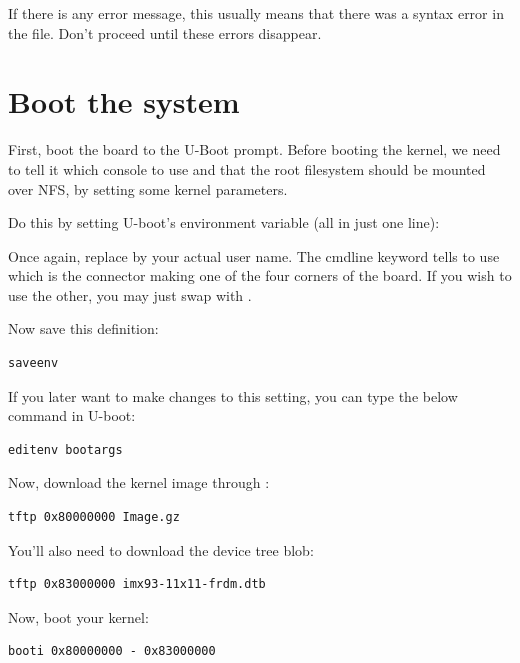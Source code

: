 If there is any error message, this usually means that there was a
syntax error in the  file. Don't proceed until these
errors disappear.

\section{Boot the system}

First, boot the board to the U-Boot prompt. Before booting the kernel,
we need to tell it which console to use and that the root filesystem
should be mounted over NFS, by setting some kernel parameters.

Do this by setting U-boot's  environment variable (all in
just one line):


Once again, replace  by your actual user name. The 
cmdline keyword tells to use  which is the connector making one of
the four corners of the board. If you wish to use the other, you may just swap
 with .

Now save this definition:
\begin{verbatim}
saveenv
\end{verbatim}

If you later want to make changes to this setting, you can type the
below command in U-boot:

\begin{verbatim}
editenv bootargs
\end{verbatim}

Now, download the kernel image through :

\begin{verbatim}
tftp 0x80000000 Image.gz
\end{verbatim}

You'll also need to download the device tree blob:

\begin{verbatim}
tftp 0x83000000 imx93-11x11-frdm.dtb
\end{verbatim}

Now, boot your kernel:

\begin{verbatim}
booti 0x80000000 - 0x83000000
\end{verbatim}

